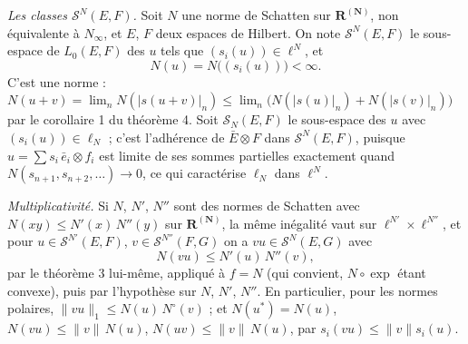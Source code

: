 \documentclass[11pt,a4paper]{article}
\begin{document}
\emph{Les classes $\mathcal{S}^N(E,F)$.} Soit $N$ une norme de Schatten sur
$\mathbf{R}^{(\mathbf{N})}$, non équivalente à $N_\infty$, et $E$, $F$ deux
espaces de Hilbert. On note $\mathcal{S}^N(E,F)$ le sous-espace de $L_0(E,F)$
des $u$ tels que $(s_i(u)) \in \ell^N$, et
\[
  N(u) = N\bigl((s_i(u))\bigr) < \infty .
\]
C'est une norme : $N(u+v) = \lim_n N(|s(u+v)|_n) \leq \lim_n \bigl(N(|s(u)|_n)
+ N(|s(v)|_n)\bigr)$ par le corollaire 1 du théorème 4. Soit
$\mathcal{S}_N(E,F)$ le sous-espace des $u$ avec $(s_i(u)) \in \ell_N$ ;
c'est l'adhérence de $\bar{E} \otimes F$ dans $\mathcal{S}^N(E,F)$, puisque
$u = \sum s_i\,\bar{e}_i \otimes f_i$ est limite de ses sommes partielles
exactement quand $N(s_{n+1}, s_{n+2}, \ldots) \to 0$, ce qui caractérise
$\ell_N$ dans $\ell^N$.

\emph{Multiplicativité.} Si $N$, $N'$, $N''$ sont des normes de Schatten
avec $N(xy) \leq N'(x)\,N''(y)$ sur $\mathbf{R}^{(\mathbf{N})}$, la même
inégalité vaut sur $\ell^{N'} \times \ell^{N''}$, et pour $u \in
\mathcal{S}^{N'}(E,F)$, $v \in \mathcal{S}^{N''}(F,G)$ on a $vu \in
\mathcal{S}^{N}(E,G)$ avec
\[
  N(vu) \leq N'(u)\,N''(v),
\]
par le théorème 3 lui-même, appliqué à $f = N$ (qui convient, $N \circ
\exp$ étant convexe), puis par l'hypothèse sur $N$, $N'$, $N''$. En
particulier,
pour les normes polaires, $\|vu\|_1 \leq N(u)\,N^{\circ}(v)$ ; et $N(u^{*}) =
N(u)$, $N(vu) \leq \|v\|\,N(u)$, $N(uv) \leq \|v\|\,N(u)$, par $s_i(vu) \leq
\|v\| s_i(u)$.
\end{document}
